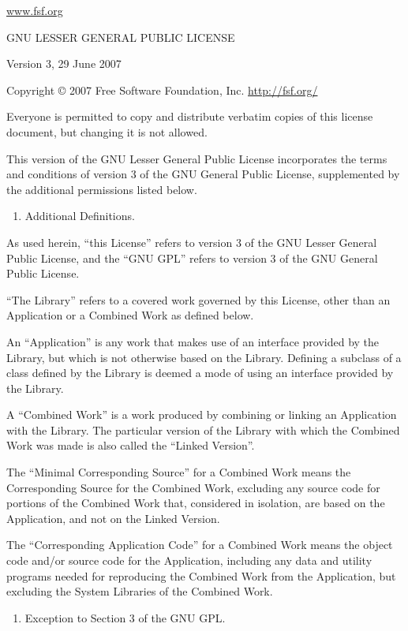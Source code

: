 \documentclass[a4paper,DIV=11
]{scrartcl}
\begin{document}
\url{www.fsf.org}

GNU LESSER GENERAL PUBLIC LICENSE

Version 3, 29 June 2007

Copyright © 2007 Free Software Foundation, Inc. \url{http://fsf.org/}

Everyone is permitted to copy and distribute verbatim copies of this
license document, but changing it is not allowed.

This version of the GNU Lesser General Public License incorporates the
terms and conditions of version 3 of the GNU General Public License,
supplemented by the additional permissions listed below.

\begin{enumerate}
\def\labelenumi{\arabic{enumi}.}
\item
  Additional Definitions.
\end{enumerate}

As used herein, ``this License'' refers to version 3 of the GNU Lesser
General Public License, and the ``GNU GPL'' refers to version 3 of the
GNU General Public License.

``The Library'' refers to a covered work governed by this License, other
than an Application or a Combined Work as defined below.

An ``Application'' is any work that makes use of an interface provided
by the Library, but which is not otherwise based on the Library.
Defining a subclass of a class defined by the Library is deemed a mode
of using an interface provided by the Library.

A ``Combined Work'' is a work produced by combining or linking an
Application with the Library. The particular version of the Library with
which the Combined Work was made is also called the ``Linked Version''.

The ``Minimal Corresponding Source'' for a Combined Work means the
Corresponding Source for the Combined Work, excluding any source code
for portions of the Combined Work that, considered in isolation, are
based on the Application, and not on the Linked Version.

The ``Corresponding Application Code'' for a Combined Work means the
object code and/or source code for the Application, including any data
and utility programs needed for reproducing the Combined Work from the
Application, but excluding the System Libraries of the Combined Work.

\begin{enumerate}
\def\labelenumi{\arabic{enumi}.}
\item
  Exception to Section 3 of the GNU GPL.
\end{enumerate}
\end{document}
